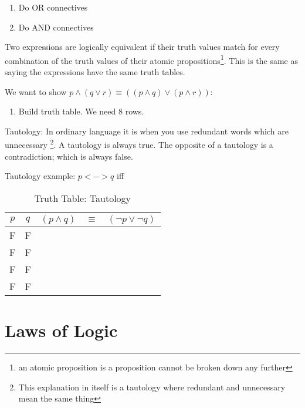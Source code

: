 \begin{enumerate}
  \item Do OR connectives
  \item Do AND connectives
\end{enumerate}


Two expressions are logically equivalent if their truth values match for every
combination of the truth values of their atomic propositions\footnote{an atomic
proposition is a proposition cannot be broken down any further}. This is the
same as saying the expressions have the same truth tables.

We want to show $p \land (q \lor r) \equiv ( (p \land q) \lor (p \land r) )$:
\begin{enumerate}
  \item Build truth table. We need 8 rows.
\end{enumerate}

Tautology: In ordinary language it is when you use redundant words which are
unnecessary \footnote{This explanation in itself is a tautology where redundant
and unnecessary mean the same thing}. A tautology is always true. The opposite
of a tautology is a contradiction; which is always false.

Tautology example: $p <-> q $ iff 

\begin{table}[!htb]
\label{tab:TruthTableTautology}
\begin{tabularx}{\linewidth}{| c | c | c | c | X |} \hline
  $p$ & $q$ & $(p \land q) $ & $ \equiv $ & $ (\lnot p \lor \lnot q) $
                                                      \\ \hline \hline
   F  &  F  &               &       &                 \\ \hline
   F  &  F  &               &       &                 \\ \hline
   F  &  F  &               &       &                 \\ \hline
   F  &  F  &               &       &                 \\ \hline
\end{tabularx}
\caption{Truth Table: Tautology}
\end{table}

\section{Laws of Logic}
\label{sec:LawsOfLogic}

